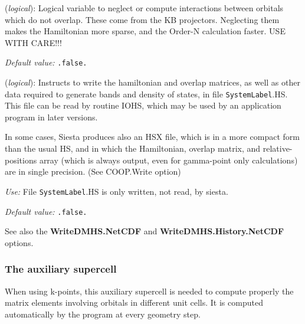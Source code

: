 \documentclass[11pt]{article}
\begin{document}
\begin{description}
\itemsep 10pt
\parsep 0pt

\item[{\bf NeglNonOverlapInt}] ({\it logical}): 
Logical variable to neglect or compute interactions between orbitals
which do not overlap. These come from the KB projectors.
Neglecting them makes the Hamiltonian more sparse, and
the Order-N calculation faster.  USE WITH CARE!!!

{\it Default value:} {\tt .false.}

\item[{\bf SaveHS}] ({\it logical}): 
Instructs to write the hamiltonian and overlap matrices, as well
as other data required to generate bands and density of states,
in file {\tt SystemLabel}.HS. This file can be read by routine IOHS,
which may be used by an application program in later versions.

In some cases, {\sc Siesta} produces also an HSX file, which is in a
more compact form than the usual HS, and in which the Hamiltonian,
overlap matrix, and relative-positions array (which is always output,
even for gamma-point only calculations) are in single precision.
(See COOP.Write option)

{\it Use:} File {\tt SystemLabel}.HS is only written, not read, by siesta.

{\it Default value:} {\tt .false.}
        
See also the {\bf WriteDMHS.NetCDF} and {\bf WriteDMHS.History.NetCDF}
options.
\end{description}

\subsubsection{The auxiliary supercell}

When using k-points, this auxiliary supercell is needed to compute properly
the matrix elements involving orbitals in different unit cells. 
It is computed automatically by the program at every geometry step. 
\end{document}
